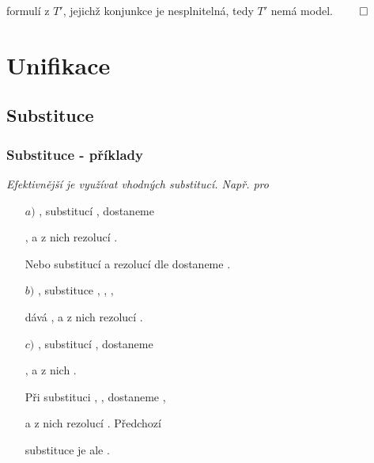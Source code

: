     formulí z $T'$, jejichž konjunkce je nesplnitelná, tedy $T'$ nemá model. $\qed$
    
    
    


\section{Unifikace}\label{section:unification}
\todo

\subsection{Substituce}\todo

\subsubsection*{Substituce - příklady}
    
    {\it Efektivnější je využívat vhodných substitucí. Např. pro}
    \smallskip
    
    \begin{enumerate}
    \item[$a)$] ,  substitucí ,  dostaneme
    \smallskip
    
    ,  a z nich rezolucí .
    \medskip
    
    Nebo substitucí  a rezolucí dle  dostaneme .
    \medskip
    
    \item[$b)$] ,  substituce , , , 
    \smallskip
    
    dává ,  a z nich rezolucí .
    \medskip
    
    \item[$c)$] ,  substitucí ,  dostaneme
    \smallskip
    
    ,  a z nich .
    \medskip
    
    Při substituci , ,  dostaneme ,
    \smallskip
    
     a z nich rezolucí . Předchozí
    \smallskip
    
    substituce je ale .
    \end{enumerate}
    
